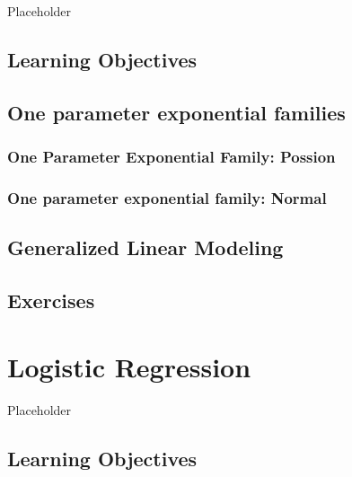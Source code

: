 \documentclass[
]{krantz}
\begin{document}
Placeholder

\hypertarget{learning-objectives-4}{%
\section{Learning Objectives}\label{learning-objectives-4}}

\hypertarget{one-parameter-exponential-families}{%
\section{One parameter exponential families}\label{one-parameter-exponential-families}}

\hypertarget{one-parameter-exponential-family-possion}{%
\subsection{One Parameter Exponential Family: Possion}\label{one-parameter-exponential-family-possion}}

\hypertarget{one-parameter-exponential-family-normal}{%
\subsection{One parameter exponential family: Normal}\label{one-parameter-exponential-family-normal}}

\hypertarget{generalized-linear-modeling}{%
\section{Generalized Linear Modeling}\label{generalized-linear-modeling}}

\hypertarget{exercises-4}{%
\section{Exercises}\label{exercises-4}}

\hypertarget{ch-logreg}{%
\chapter{Logistic Regression}\label{ch-logreg}}

Placeholder

\hypertarget{learning-objectives-5}{%
\section{Learning Objectives}\label{learning-objectives-5}}
\end{document}
